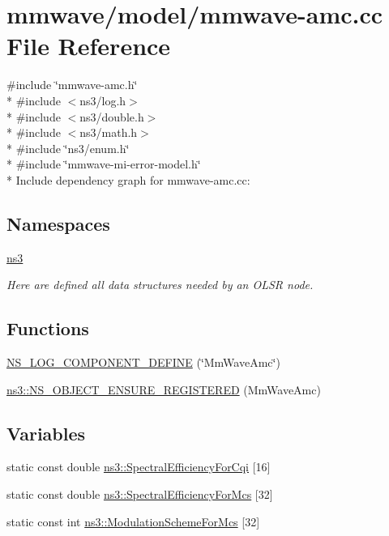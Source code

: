 \hypertarget{mmwave-amc_8cc}{}\section{mmwave/model/mmwave-\/amc.cc File Reference}
\label{mmwave-amc_8cc}
{\ttfamily \#include \char`\"{}mmwave-\/amc.\+h\char`\"{}}\\*
{\ttfamily \#include $<$ns3/log.\+h$>$}\\*
{\ttfamily \#include $<$ns3/double.\+h$>$}\\*
{\ttfamily \#include $<$ns3/math.\+h$>$}\\*
{\ttfamily \#include \char`\"{}ns3/enum.\+h\char`\"{}}\\*
{\ttfamily \#include \char`\"{}mmwave-\/mi-\/error-\/model.\+h\char`\"{}}\\*
Include dependency graph for mmwave-\/amc.cc\+:
\subsection*{Namespaces}
\begin{DoxyCompactItemize}
\item 
 \hyperlink{namespacens3}{ns3}
\begin{DoxyCompactList}\small\item\em Here are defined all data structures needed by an O\+L\+SR node. \end{DoxyCompactList}\end{DoxyCompactItemize}
\subsection*{Functions}
\begin{DoxyCompactItemize}
\item 
\hyperlink{mmwave-amc_8cc_a17657d1a606b80127a13537de9d535c7}{N\+S\+\_\+\+L\+O\+G\+\_\+\+C\+O\+M\+P\+O\+N\+E\+N\+T\+\_\+\+D\+E\+F\+I\+NE} (\char`\"{}Mm\+Wave\+Amc\char`\"{})
\item 
\hyperlink{namespacens3_a34a72e8f284363c8d9db7e087542eefa}{ns3\+::\+N\+S\+\_\+\+O\+B\+J\+E\+C\+T\+\_\+\+E\+N\+S\+U\+R\+E\+\_\+\+R\+E\+G\+I\+S\+T\+E\+R\+ED} (Mm\+Wave\+Amc)
\end{DoxyCompactItemize}
\subsection*{Variables}
\begin{DoxyCompactItemize}
\item 
static const double \hyperlink{namespacens3_aa667d4abe6d529b6b88203fd52973c8a}{ns3\+::\+Spectral\+Efficiency\+For\+Cqi} \mbox{[}16\mbox{]}
\item 
static const double \hyperlink{namespacens3_aaa522c5b4dc5c1b69cfa3c8b5796cac9}{ns3\+::\+Spectral\+Efficiency\+For\+Mcs} \mbox{[}32\mbox{]}
\item 
static const int \hyperlink{namespacens3_ae77af3b468826ac14e69fe8175220f80}{ns3\+::\+Modulation\+Scheme\+For\+Mcs} \mbox{[}32\mbox{]}
\end{DoxyCompactItemize}



